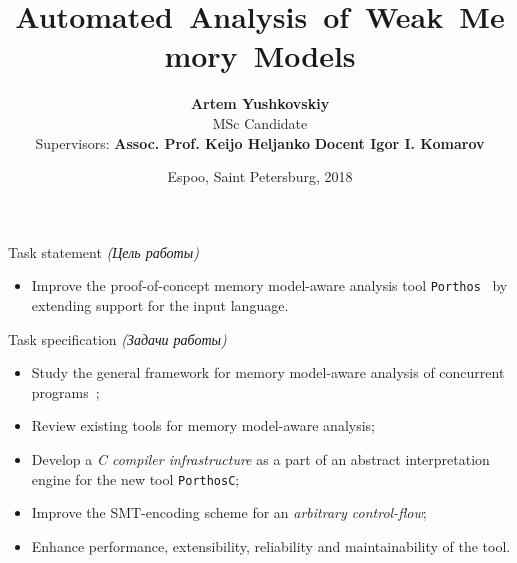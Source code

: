 \documentclass[aspectratio=149]{beamer}
\title{\nohyphens{\textbf{Automated~Analysis~of~Weak~Memory~Models}}}
\author{\textbf{Artem Yushkovskiy}\inst{1,2} \\ 
{\scriptsize MSc Candidate}
\\ \vspace{1em}
{\footnotesize\raggedleft Supervisors: \textbf{Assoc. Prof. Keijo Heljanko}\inst{1} \newline
\hphantom{Supervis} \textbf{Docent Igor I. Komarov}\inst{2} }
}%
\institute
{
  \inst{1}%
  \textbf{Aalto University} (Espoo, Finland) \\
  Department of Computer Science, \\
  School of Science
  \and
  \inst{2}%
  \textbf{ITMO University} (Saint Petersburg, Russia) \\
  Faculty of Information Security \\
  and Computer Technologies
}
\date{\scriptsize Espoo, Saint Petersburg, 2018}
\newcommand*{\rus}[1]{%
  \textit{#1}
}
\newcommand{\tool}[1]{\texttt{#1}}
\begin{document}

\begin{frame}
  \titlepage
\end{frame}







\begin{frame}{Task statement \rus{(Цель работы)}}
\begin{itemize}
\item Improve the proof-of-concept memory model-aware analysis tool \texttt{Porthos}~\cite{Porthos17a} by extending support for the input language.
\end{itemize}
\end{frame}


\begin{frame}{Task specification \rus{(Задачи работы)}}
\begin{itemize}
\item Study the general framework for memory model-aware analysis of concurrent programs~\cite{alglave2010shared};
\item Review existing tools for memory model-aware analysis;
\item Develop a \textit{C compiler infrastructure} as a part of an abstract interpretation engine for the new tool \tool{PorthosC};
\item Improve the SMT-encoding scheme for an \textit{arbitrary control-flow};
\item Enhance performance, extensibility, reliability and maintainability of the tool.
\end{itemize}
\end{frame}
\end{document}
